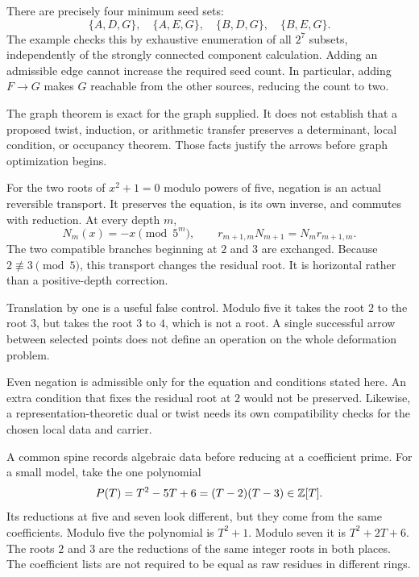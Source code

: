 There are precisely four minimum seed sets:
\[
\{A,D,G\},\quad\{A,E,G\},\quad
\{B,D,G\},\quad\{B,E,G\}.
\]
The example checks this by exhaustive enumeration of all $2^7$ subsets, independently of the strongly connected component calculation. Adding an admissible edge cannot increase the required seed count. In particular, adding $F\to G$ makes $G$ reachable from the other sources, reducing the count to two.

The graph theorem is exact for the graph supplied. It does not establish that a proposed twist, induction, or arithmetic transfer preserves a determinant, local condition, or occupancy theorem. Those facts justify the arrows before graph optimization begins.

For the two roots of $x^2+1=0$ modulo powers of five, negation is an actual reversible transport. It preserves the equation, is its own inverse, and commutes with reduction.
At every depth $m$,
\[
N_m(x)=-x\pmod{5^m},\qquad
r_{m+1,m}N_{m+1}=N_mr_{m+1,m}.
\]
The two compatible branches beginning at $2$ and $3$ are exchanged. Because $2\not\equiv3\pmod5$, this transport changes the residual root. It is horizontal rather than a positive-depth correction.

Translation by one is a useful false control. Modulo five it takes the root $2$ to the root $3$, but takes the root $3$ to $4$, which is not a root. A single successful arrow between selected points does not define an operation on the whole deformation problem.

Even negation is admissible only for the equation and conditions stated here. An extra condition that fixes the residual root at $2$ would not be preserved. Likewise, a representation-theoretic dual or twist needs its own compatibility checks for the chosen local data and carrier.

A common spine records algebraic data before reducing at a coefficient prime. For a small model, take the one polynomial
\[
P(T)=T^2-5T+6=(T-2)(T-3)\in\mathbb Z[T].
\]
Its reductions at five and seven look different, but they come from the same coefficients.
Modulo five the polynomial is $T^2+1$. Modulo seven it is $T^2+2T+6$. The roots $2$ and $3$ are the reductions of the same integer roots in both places. The coefficient lists are not required to be equal as raw residues in different rings.


